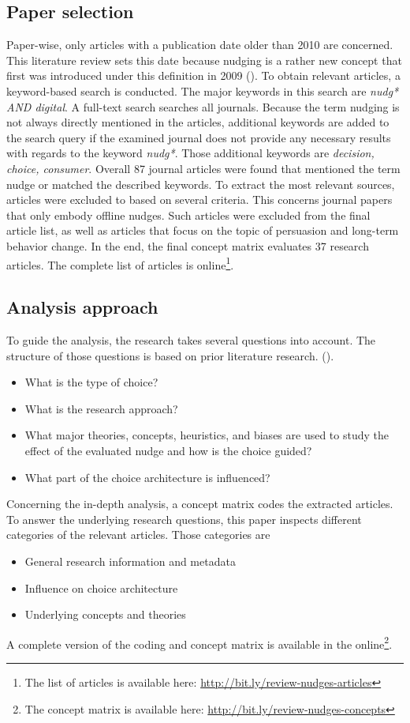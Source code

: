 \subsection{Paper selection}
Paper-wise, only articles with a publication date older than 2010 are concerned. This literature review sets this date because nudging is a rather new concept that first was introduced under this definition in 2009 (\cite{thaler_nudge:_2009}). To obtain relevant articles, a keyword-based search is conducted. The major keywords in this search are \textit{nudg* AND digital}. A full-text search searches all journals. Because the term nudging is not always directly mentioned in the articles, additional keywords are added to the search query if the examined journal does not provide any necessary results with regards to the keyword \textit{nudg*}. Those additional keywords are \textit{decision, choice, consumer}. Overall 87 journal articles were found that mentioned the term nudge or matched the described keywords. To extract the most relevant sources, articles were excluded to based on several criteria. This concerns journal papers that only embody offline nudges. Such articles were excluded from the final article list, as well as articles that focus on the topic of persuasion and long-term behavior change. In the end, the final concept matrix evaluates 37 research articles. The complete list of articles is online\footnote{The list of articles is available here: \url{http://bit.ly/review-nudges-articles}}.

\subsection{Analysis approach}
To guide the analysis, the research takes several questions into account. The structure of those questions is based on prior literature research. (\cite{alavi_review_1992}).
\begin{itemize}
\item What is the type of choice?
\item What is the research approach?
\item What major theories, concepts, heuristics, and biases are used to study the effect of the evaluated nudge and how is the choice guided?
\item What part of the choice architecture is influenced?
\end{itemize}

Concerning the in-depth analysis, a concept matrix codes the extracted articles. To answer the underlying research questions, this paper inspects different categories of the relevant articles. Those categories are 
\begin{itemize}
\item General research information and metadata
\item Influence on choice architecture
\item Underlying concepts and theories
\end{itemize}

A complete version of the coding and concept matrix is available in the online\footnote{The concept matrix is available here: \url{http://bit.ly/review-nudges-concepts}}.